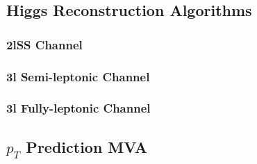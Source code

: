
\subsection{Higgs Reconstruction Algorithms}
\label{subsec:higgsRecoMVA}

\subsubsection{2lSS Channel}
\label{subsec:higgs2lSS}




\subsubsection{3l Semi-leptonic Channel}
\label{subsec:higgs3lS}




\subsubsection{3l Fully-leptonic Channel}                                  
\label{subsec:higgs3lF}                                                                                                   




\subsection{$p_T$ Prediction MVA}
\label{subsec:ptMVA}

